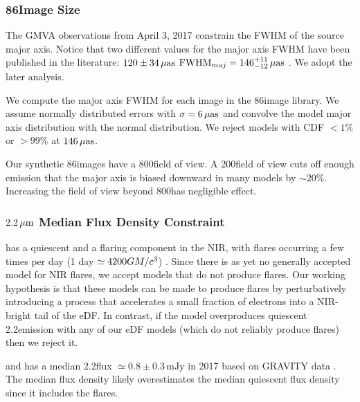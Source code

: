 \subsubsection{86\GHz Image Size}

The GMVA observations from April 3, 2017 constrain the FWHM of the source major axis.  Notice that two different values for the major axis FWHM have been published in the literature: $120 \pm 34\,\mathrm{\mu as}$ \citep{2019ApJ...871...30I}
${\rm FWHM}_{maj} = 146^{+11}_{-12}\,\mathrm{\mu as}$ \citep[95\% confidence][]{2021ApJ...915...99I}.  We adopt the later analysis.

We compute the major axis FWHM for each image in the 86\GHz image library.  We assume normally distributed errors with $\sigma = 6\,\mathrm{\mu as}$ and convolve the model major axis distribution with the normal distribution.  We reject models with CDF $< 1\%$ or $> 99\%$ at $146\,\mathrm{\mu as}$.

Our synthetic 86\GHz images have a 800\uas field of view.  A 200\uas field of view cuts off enough emission that the major axis is biased downward in many models by $\sim 20\%$.  Increasing the field of view beyond 800\uas has negligible effect.

\subsubsection{$2.2\,\mu\mathrm{m}$ Median Flux Density Constraint}\label{subsec:nir}

\sgra has a quiescent and a flaring component in the NIR, with flares occurring a few times per day
(1 day $\simeq 4200 GM/c^3$) \citep{2018ApJ...863...15W}.  Since there is as yet no generally accepted model for NIR flares, we accept models that do not produce flares.  Our working hypothesis is that these models can be made to produce flares by perturbatively introducing a process that accelerates a small fraction of electrons into a  NIR-bright tail of the eDF.  In contrast, if the model overproduces quiescent 2.2\um emission with any of our eDF models (which do not reliably produce flares) then we reject it.

\sgra and has a median 2.2\um flux $\simeq 0.8 \pm 0.3\,\mathrm{mJy}$ in 2017 based on GRAVITY data \citep[][see Table 1]{2020A&A...638A...2G}.  The median flux density likely overestimates the median quiescent flux density since it includes the flares.

